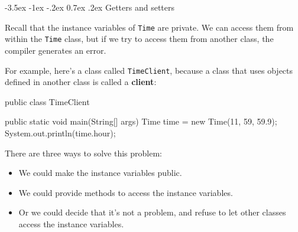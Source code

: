 \documentclass[12pt]{book}
\makeatletter
\theoremstyle{exercise}
\newcommand{\java}[1]{\verb"#1"}
\renewcommand{\section}{\@startsection{section}{1}{\z@}%
    {-3.5ex \@plus -1ex \@minus -.2ex}%
    {0.7ex \@plus.2ex}%
    {\normalfont\Large\bfseries}}
\newcommand{\java}[1]{\lstinline{#1}} %
\makeatother
\begin{document}








\section{Getters and setters}

Recall that the instance variables of \java{Time} are private.
We can access them from within the \java{Time} class, but if we try to access them from another class, the compiler generates an error.

For example, here's a class called \java{TimeClient}, because a class that uses objects defined in another class is called a {\bf client}:

\begin{code}
public class TimeClient {

    public static void main(String[] args) {
        Time time = new Time(11, 59, 59.9);
        System.out.println(time.hour);
    }

}
\end{code}


There are three ways to solve this problem:

\begin{itemize}

\item We could make the instance variables public.

\item We could provide methods to access the instance variables.

\item Or we could decide that it's not a problem, and refuse to let other classes access the instance variables.

\end{itemize}
\end{document}
